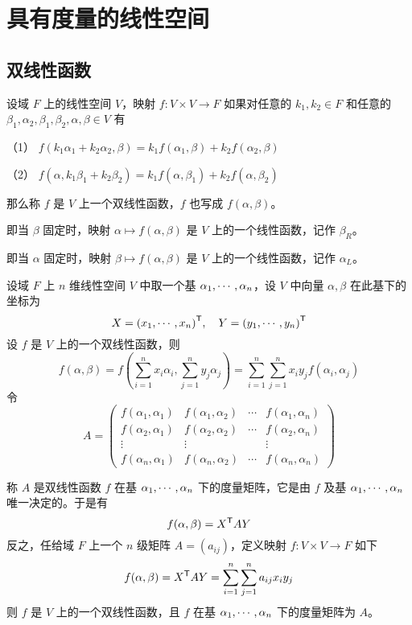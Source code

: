\chapter{具有度量的线性空间}

\section{双线性函数}

\begin{definition}[双线性函数]
	设域 $F$ 上的线性空间 $V$，映射 $f : V \times V \to F$ 如果对任意的 $k_1,k_2 \in F$ 和任意的 $\beta_1,\alpha_2,\beta_1,\beta_2,\alpha,\beta \in V$ 有
	
	（1） $f(k_1\alpha_1 + k_2\alpha_2,\beta) = k_1 f(\alpha_1,\beta) + k_2f(\alpha_2,\beta)$
	
	（2） $f(\alpha,k_1\beta_1 + k_2\beta_2) = k_1 f(\alpha,\beta_1) + k_2f(\alpha,\beta_2)$
	
	那么称 $f$ 是 $V$ 上一个双线性函数，$f$ 也写成 $f(\alpha,\beta)$。
\end{definition}

即当 $\beta$ 固定时，映射 $\alpha \mapsto f(\alpha,\beta)$ 是 $V$ 上的一个线性函数，记作 $\beta_R$。

即当 $\alpha$ 固定时，映射 $\beta \mapsto f(\alpha,\beta)$ 是 $V$ 上的一个线性函数，记作 $\alpha_L$。

设域 $F$ 上 $n$ 维线性空间 $V$ 中取一个基 $\alpha_1,\cdots,\alpha_n$，设 $V$ 中向量 $\alpha,\beta$ 在此基下的坐标为
\[ X = {(x_1,\cdots,x_n)}^\mathsf{T}, \quad Y = {(y_1,\cdots,y_n)}^\mathsf{T} \]
设 $f$ 是 $V$ 上的一个双线性函数，则
\[ f(\alpha,\beta) = f\left( \sum_{i=1}^n x_i\alpha_i,\sum_{j=1}^ny_j\alpha_j \right) = \sum_{i=1}^n\sum_{j=1}^n x_iy_jf(\alpha_i,\alpha_j) \]
令
\[ A = \left(\begin{matrix}
			f(\alpha_1,\alpha_1) & f(\alpha_1,\alpha_2) & \cdots & f(\alpha_1,\alpha_n)  \\
			f(\alpha_2,\alpha_1) & f(\alpha_2,\alpha_2) & \cdots & f(\alpha_2,\alpha_n)  \\
			\vdots               & \vdots               &        & \vdots                \\
			f(\alpha_n,\alpha_1) & f(\alpha_n,\alpha_2) & \cdots & f(\alpha_n,\alpha_n)
		\end{matrix}\right) \]

称 $A$ 是双线性函数 $f$ 在基 $\alpha_1,\cdots,\alpha_n$ 下的度量矩阵，它是由 $f$ 及基 $\alpha_1,\cdots,\alpha_n$ 唯一决定的。于是有
\[ f(\alpha,\beta) = {X}^\mathsf{T}AY \]
反之，任给域 $F$ 上一个 $n$ 级矩阵 $A = (a_{ij})$，定义映射 $f : V \times V \to F$ 如下
\[ f(\alpha,\beta) = {X}^\mathsf{T}AY = \sum_{i=1}^n\sum_{j=1}^na_{ij}x_iy_j \]
则 $f$ 是 $V$ 上的一个双线性函数，且 $f$ 在基 $\alpha_1,\cdots,\alpha_n$ 下的度量矩阵为 $A$。

